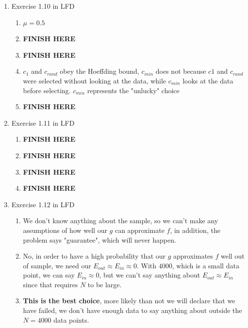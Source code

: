 \documentclass{article}
\begin{document}
\begin{enumerate}
        \item Exercise 1.10 in LFD
        \begin{enumerate}[label=(\alph*)]
            \item $\mu = 0.5$
            \item \textbf{FINISH HERE}
            \item \textbf{FINISH HERE}
            \item $c_1$ and $c_{rand}$ obey the Hoeffding bound, $c_{min}$ does not because $c1$ and $c_{rand}$ were selected without looking at the data, while $c_{min}$ looks at the data before selecting. $c_{min}$ represents the "unlucky" choice
            \item \textbf{FINISH HERE}
        \end{enumerate}

        \item Exercise 1.11 in LFD
        \begin{enumerate}[label=(\alph*)]
            \item \textbf{FINISH HERE}
            \item \textbf{FINISH HERE}
            \item \textbf{FINISH HERE}
            \item \textbf{FINISH HERE}
        \end{enumerate}

        \item Exercise 1.12 in LFD
        \begin{enumerate}[label=(\alph*)]
            \item We don't know anything about the sample, so we can't make any assumptions of how well our $g$ can approximate $f$, in addition, the problem says "guarantee", which will never happen.
            \item No, in order to have a high probability that our $g$ approximates $f$ well out of sample, we need our $E_{out} \approx E_{in} \approx 0$. With $4000$, which is a small data point, we can say $E_{in} \approx 0$, but we can't say anything about $E_{out} \approx E_{in}$ since that requires $N$ to be large.
            \item \textbf{This is the best choice}, more likely than not we will declare that we have failed, we don't have enough data to say anything about outside the $N = 4000$ data points.
        \end{enumerate}


\end{enumerate}
\end{document}
